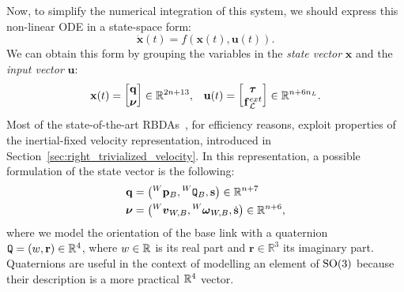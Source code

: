 Now, to simplify the numerical integration of this system, we should express this non-linear \ac{ODE} in a state-space form:
%
\begin{equation*}
    \dot{\mathbf{x}}(t) = f\left(\mathbf{x}(t), \mathbf{u}(t)\right) .
\end{equation*}
%
We can obtain this form by grouping the variables in the \emph{state vector} $\mathbf{x}$ and the \emph{input vector} $\mathbf{u}$:
%
\begin{align*}
    \mathbf{x}(t) =
    \begin{bmatrix}
        \mathbf{q} \\ \boldsymbol{\nu}
    \end{bmatrix}
    \in \mathbb{R}^{2n+13},
    &&
    \mathbf{u}(t) =
    \begin{bmatrix}
        \boldsymbol{\tau} \\ \forcesix^{ext}_\mathcal{L} 
    \end{bmatrix}
    \in \mathbb{R}^{n+6n_L}.
\end{align*}
%
Most of the state-of-the-art \aclp{RBDA}~\parencite{featherstone_rigid_2008}, for efficiency reasons, exploit properties of the inertial-fixed velocity representation, introduced in Section~\ref{sec:right_trivialized_velocity}.
In this representation, a possible formulation of the state vector is the following:
%
\begin{align*}
    \mathbf{q} &= \left( \pos[W]_B,  \quat[W]_B, \mathbf{s} \right) \in \mathbb{R}^{n+7} \\
    \boldsymbol{\nu} &= \left( \vellin[W]_{W,B}, \velang[W]_{W,B}, \dot{\mathbf{s}} \right) \in \mathbb{R}^{n+6}
    ,
\end{align*}
%
where we model the orientation of the base link with a quaternion $\quat = (w, \mathbf{r}) \in \mathbb{R}^4$, where $w \in \realn$ is its real part and $\mathbf{r} \in \mathbb{R}^3$ its imaginary part.
Quaternions are useful in the context of modelling an element of $\SO(3)$ because their description is a more practical $\realn^4$ vector.

